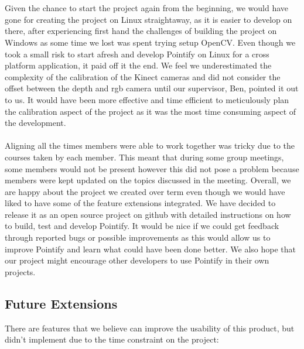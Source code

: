 \documentclass{article}
\begin{document}
\\\\
Given the chance to start the project again from the beginning, we would have gone for creating the project on Linux straightaway, as it is easier to develop on there, after experiencing first hand the challenges of building the project on Windows as some time we lost was spent trying setup OpenCV. Even though we took a small risk to start afresh and develop Pointify on Linux for a cross platform application, it paid off it the end. We feel we underestimated the complexity of the calibration of the Kinect cameras and did not consider the offset between the depth and rgb camera until our supervisor, Ben, pointed it out to us. It would have been more effective and time efficient to meticulously plan the calibration aspect of the project as it was the most time consuming aspect of the development.
\\\\
Aligning all the times members were able to work together was tricky due to the courses taken by each member. This meant that during some group meetings, some members would not be present however this did not pose a problem because members were kept updated on the topics discussed in the meeting. Overall, we are happy about the project we created over term even though we would have liked to have some of the feature extensions integrated. We have decided to release it as an open source project on github with detailed instructions on how to build, test and develop Pointify. It would be nice if we could get feedback through reported bugs or possible improvements as this would allow us to improve Pointify and learn what could have been done better. We also hope that our project might encourage other developers to use Pointify in their own projects. 
\newpage
\subsection{Future Extensions}
There are features that we believe can improve the usability of this product, but didn't implement due to the time constraint on the project:
\end{document}
